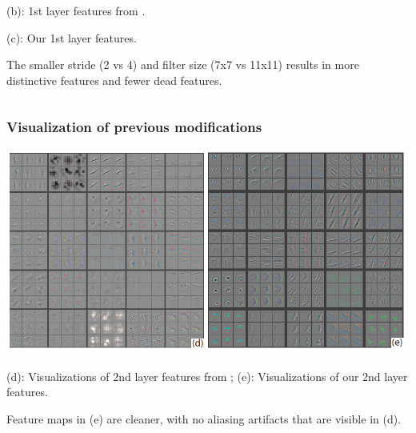 \begin{frame}
\begin{columns}
\begin{column}{.4\textwidth}
		(b): 1st layer features from \cite{krizhevsky2012imagenet}.

		\medskip

		(c): Our 1st layer features.

		\pause

		\bigskip

		The smaller stride (2 vs 4) and filter size (7x7 vs 11x11) results in more distinctive features and fewer dead features.
		\end{column}%
	\end{columns}








\end{frame}

\begin{frame}
	\frametitle{Visualization of previous modifications}

	\begin{center}
		\includegraphics[scale=0.8]{figs/ZFNet_modif_2layer}
	\end{center}

	(d): Visualizations of 2nd layer features from \cite{krizhevsky2012imagenet};  (e): Visualizations of our 2nd layer features.

	\pause

	Feature maps in (e) are cleaner, with no aliasing artifacts that are visible in (d).

\end{frame}




